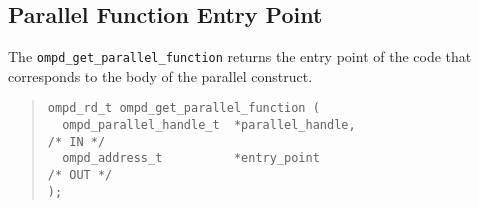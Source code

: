 \subsection{Parallel Function Entry Point}

The \texttt{ompd\_get\_parallel\_function} returns the
entry point of the code that corresponds to the body of
the parallel construct.

\begin{quote}
\begin{lstlisting}
ompd_rd_t ompd_get_parallel_function (
  ompd_parallel_handle_t  *parallel_handle,                         /* IN */
  ompd_address_t          *entry_point                             /* OUT */
);
\end{lstlisting}
\end{quote}
